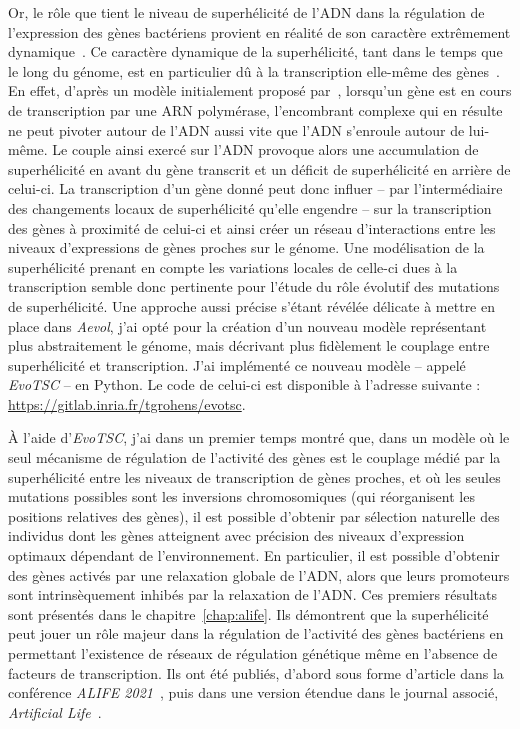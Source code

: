 Or, le rôle que tient le niveau de superhélicité de l'ADN dans la régulation de l'expression des gènes bactériens provient en réalité de son caractère extrêmement dynamique~\citep{martisb.2019}.
Ce caractère dynamique de la superhélicité, tant dans le temps que le long du génome, est en particulier dû à la transcription elle-même des gènes~\citep{visser2022}.
En effet, d'après un modèle initialement proposé par~\cite{liu1987}, lorsqu'un gène est en cours de transcription par une ARN polymérase, l'encombrant complexe qui en résulte ne peut pivoter autour de l'ADN aussi vite que l'ADN s'enroule autour de lui-même.
Le couple ainsi exercé sur l'ADN provoque alors une accumulation de superhélicité en avant du gène transcrit et un déficit de superhélicité en arrière de celui-ci.
La transcription d'un gène donné peut donc influer -- par l'intermédiaire des changements locaux de superhélicité qu'elle engendre -- sur la transcription des gènes à proximité de celui-ci et ainsi créer un réseau d'interactions entre les niveaux d'expressions de gènes proches sur le génome.
Une modélisation de la superhélicité prenant en compte les variations locales de celle-ci dues à la transcription semble donc pertinente pour l'étude du rôle évolutif des mutations de superhélicité.
Une approche aussi précise s'étant révélée délicate à mettre en place dans \emph{Aevol}, j'ai opté pour la création d'un nouveau modèle représentant plus abstraitement le génome, mais décrivant plus fidèlement le couplage entre superhélicité et transcription.
J'ai implémenté ce nouveau modèle -- appelé \emph{EvoTSC} -- en Python.
Le code de celui-ci est disponible à l'adresse suivante : \url{https://gitlab.inria.fr/tgrohens/evotsc}.

À l'aide d'\emph{EvoTSC}, j'ai dans un premier temps montré que, dans un modèle où le seul mécanisme de régulation de l'activité des gènes est le couplage médié par la superhélicité entre les niveaux de transcription de gènes proches, et où les seules mutations possibles sont les inversions chromosomiques (qui réorganisent les positions relatives des gènes), il est possible d'obtenir par sélection naturelle des individus dont les gènes atteignent avec précision des niveaux d'expression optimaux dépendant de l'environnement.
En particulier, il est possible d'obtenir des gènes activés par une relaxation globale de l'ADN, alors que leurs promoteurs sont intrinsèquement inhibés par la relaxation de l'ADN.
Ces premiers résultats sont présentés dans le chapitre~\ref{chap:alife}.
Ils démontrent que la superhélicité peut jouer un rôle majeur dans la régulation de l'activité des gènes bactériens en permettant l'existence de réseaux de régulation génétique même en l'absence de facteurs de transcription.
Ils ont été publiés, d'abord sous forme d'article dans la conférence \emph{ALIFE 2021}~\citep{grohens2021}, puis dans une version étendue dans le journal associé, \emph{Artificial Life}~\citep{grohens2022a}.

